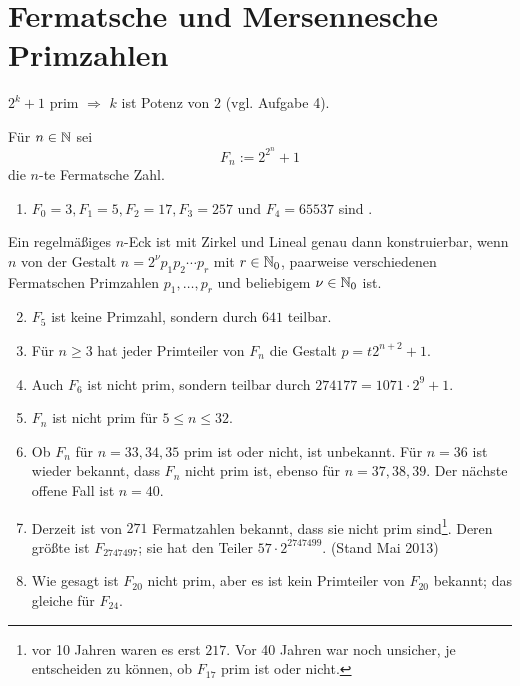\section{Fermatsche und Mersennesche Primzahlen}
\label{sec:para7}
	
	$2^k + 1$ prim $\Rightarrow$ $k$ ist Potenz von $2$ (vgl. Aufgabe 4). 
	
Für $n \in \mathbb{N}$ sei
\[ F_n := 2^{2^n} + 1 \]
die $n$-te Fermatsche Zahl.

\begin{enumerate}[(1)]
	\item $F_0 = 3, F_1 = 5, F_2 = 17, F_3 = 257$ und $F_4 = 65537$ sind . 
\end{enumerate}

	Ein regelmäßiges $n$-Eck ist mit Zirkel und Lineal genau dann konstruierbar, wenn $n$ von der Gestalt $n = 2^\nu p_1 p_2 \cdots p_r$ mit $r \in \mathbb{N}_0$, paarweise verschiedenen Fermatschen Primzahlen $p_1,\dots,p_r$ und beliebigem $\nu \in \mathbb{N}_0$ ist.
	
\begin{enumerate}[(1)] \setcounter{enumi}{1}
	\item $F_5$ ist keine Primzahl, sondern durch $641$ teilbar.
	\item Für $n \geq 3$ hat jeder Primteiler von $F_n$ die Gestalt $p = t 2^{n+2} + 1$.
	\item Auch $F_6$ ist nicht prim, sondern teilbar durch $274177 = 1071 \cdot 2^9 + 1$.
	\item $F_n$ ist nicht prim für $5 \leq n \leq 32$.
	\item Ob $F_n$ für $n = 33, 34, 35$ prim ist oder nicht, ist unbekannt. Für $n = 36$ ist wieder bekannt, dass $F_n$ nicht prim ist, ebenso für $n = 37, 38, 39$. Der nächste offene Fall ist $n = 40$.
	\item Derzeit ist von $271$ Fermatzahlen bekannt, dass sie nicht prim sind\footnote{vor 10 Jahren waren es erst $217$. Vor 40 Jahren war noch unsicher, je entscheiden zu können, ob $F_{17}$ prim ist oder nicht.}. Deren größte ist $F_{2747497}$; sie hat den Teiler $57 \cdot 2^{2747499}$. (Stand Mai 2013)
	\item Wie gesagt ist $F_{20}$ nicht prim, aber es ist kein Primteiler von $F_{20}$ bekannt; das gleiche für $F_{24}$.
\end{enumerate}

